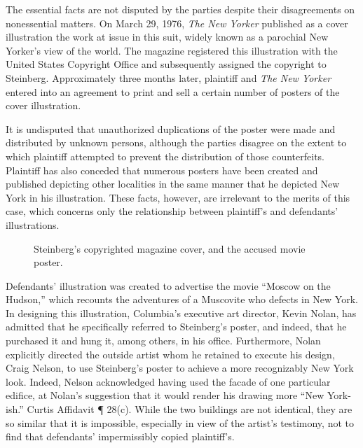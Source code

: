 
The essential facts are not disputed by the parties despite their disagreements
on nonessential matters. On March 29, 1976, \textit{The New Yorker} published as
a cover illustration the work at issue in this suit, widely known as a parochial
New Yorker's view of the world. The magazine registered this illustration with
the United States Copyright Office and subsequently assigned the copyright to
Steinberg. Approximately three months later, plaintiff and \textit{The New
Yorker} entered into an agreement to print and sell a certain number of posters
of the cover illustration.

It is undisputed that unauthorized duplications of the poster were made and
distributed by unknown persons, although the parties disagree on the extent to
which plaintiff attempted to prevent the distribution of those counterfeits.
Plaintiff has also conceded that numerous posters have been created and
published depicting other localities in the same manner that he depicted New
York in his illustration. These facts, however, are irrelevant to the merits of
this case, which concerns only the relationship  between plaintiff's and
defendants' illustrations.

\begin{figure}
\begin{center}
\end{center}
\caption{Steinberg's copyrighted magazine cover, and the accused movie poster.}
\end{figure}

Defendants' illustration was created to advertise the movie ``Moscow on the
Hudson,'' which recounts the adventures of a Muscovite who defects in New York.
In designing this illustration, Columbia's executive art director, Kevin Nolan,
has admitted that he specifically referred to Steinberg's poster, and indeed,
that he purchased it and hung it, among others, in his office. Furthermore,
Nolan explicitly directed the outside artist whom he retained to execute his
design, Craig Nelson, to use Steinberg's poster to achieve a more recognizably
New York look. Indeed, Nelson acknowledged having used the facade of one
particular edifice, at Nolan's suggestion that it would render his drawing more
``New York-ish.'' Curtis Affidavit ¶ 28(c). While the two buildings are not
identical, they are so similar that it is impossible, especially in view of the
artist's testimony, not to find that defendants' impermissibly copied
plaintiff's.

